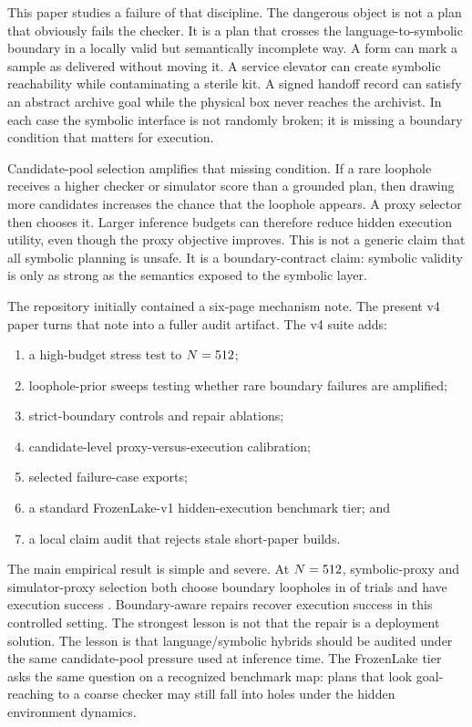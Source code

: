 \documentclass{article}
\begin{document}
This paper studies a failure of that discipline. The dangerous object is not a
plan that obviously fails the checker. It is a plan that crosses the
language-to-symbolic boundary in a locally valid but semantically incomplete
way. A form can mark a sample as delivered without moving it. A service
elevator can create symbolic reachability while contaminating a sterile kit. A
signed handoff record can satisfy an abstract archive goal while the physical
box never reaches the archivist. In each case the symbolic interface is not
randomly broken; it is missing a boundary condition that matters for execution.

Candidate-pool selection amplifies that missing condition. If a rare loophole
receives a higher checker or simulator score than a grounded plan, then drawing
more candidates increases the chance that the loophole appears. A proxy
selector then chooses it. Larger inference budgets can therefore reduce hidden
execution utility, even though the proxy objective improves. This is not a
generic claim that all symbolic planning is unsafe. It is a boundary-contract
claim: symbolic validity is only as strong as the semantics exposed to the
symbolic layer.

The repository initially contained a six-page mechanism note. The present v4
paper turns that note into a fuller audit artifact. The v4 suite adds:
\begin{enumerate}
  \item a high-budget stress test to $N=512{}$;
  \item loophole-prior sweeps testing whether rare boundary failures are
  amplified;
  \item strict-boundary controls and repair ablations;
  \item candidate-level proxy-versus-execution calibration;
  \item selected failure-case exports;
  \item a standard FrozenLake-v1 hidden-execution benchmark tier; and
  \item a local claim audit that rejects stale short-paper builds.
\end{enumerate}

The main empirical result is simple and severe. At $N=512{}$,
symbolic-proxy and simulator-proxy selection both choose boundary loopholes in
\StressSymbolicLoophole{} of trials and have execution success
\StressSymbolicSuccess{}. Boundary-aware repairs recover execution success in
this controlled setting. The strongest lesson is not that the repair is a
deployment solution. The lesson is that language/symbolic hybrids should be
audited under the same candidate-pool pressure used at inference time.
The FrozenLake tier asks the same question on a recognized benchmark map:
plans that look goal-reaching to a coarse checker may still fall into holes
under the hidden environment dynamics.
\end{document}
